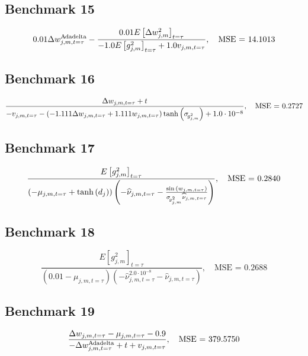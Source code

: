 \subsection*{Benchmark 15}
\begin{equation}
\label{eq:benchmark-15}
0.01 \Delta w^{\text{A}\hspace{-.018cm}\text{dadelta}}_{j, m, t=\tau} - \frac{0.01 E\left[\Delta w_{j, m}^2\right]_{t=\tau}}{- 1.0 E\left[g_{j, m}^2\right]_{t=\tau} + 1.0 v_{j, m, t=\tau}}, \quad \text{MSE = } 14.1013
\end{equation}


\subsection*{Benchmark 16}
\begin{equation}
\label{eq:benchmark-16}
\frac{\Delta w_{j, m, t=\tau} + t}{- v_{j, m, t=\tau} - \left(- 1.111 \Delta w_{j, m, t=\tau} + 1.111 w_{j,m,t=\tau}\right) \tanh{\left(\sigma_{\hspace{-.05cm}g^{2}_{j,m}} \right)} + 1.0 \cdot 10^{-8}}, \quad \text{MSE = } 0.2727
\end{equation}


\subsection*{Benchmark 17}
\begin{equation}
\label{eq:benchmark-17}
\frac{E\left[g_{j, m}^2\right]_{t=\tau}}{\left(- \mu_{j,m,t=\tau} + \tanh{\left(d_{j} \right)}\right) \left(- \widehat{\nu}_{j,m,t=\tau} - \frac{\sin{\left(w_{j,m,t=\tau} \right)}}{\sigma_{\hspace{-.05cm}g^{2}_{j,m}} \widehat{\nu}_{j,m,t=\tau}}\right)}, \quad \text{MSE = } 0.2840
\end{equation}


\subsection*{Benchmark 18}
\begin{equation}
\label{eq:benchmark-18}
\frac{E\left[g_{j, m}^2\right]_{t=\tau}}{\left(0.01 - \mu_{j,m,t=\tau}\right) \left(- \widehat{\nu}_{j,m,t=\tau}^{2.0 \cdot 10^{-8}} - \widehat{\nu}_{j,m,t=\tau}\right)}, \quad \text{MSE = } 0.2688
\end{equation}


\subsection*{Benchmark 19}
\begin{equation}
\label{eq:benchmark-19}
\frac{\Delta w_{j, m, t=\tau} - \mu_{j,m,t=\tau} - 0.9}{- \Delta w^{\text{A}\hspace{-.018cm}\text{dadelta}}_{j, m, t=\tau} + t + v_{j, m, t=\tau}}, \quad \text{MSE = } 379.5750
\end{equation}


